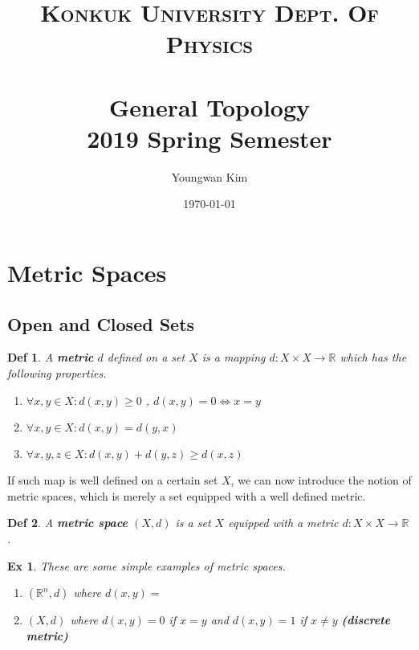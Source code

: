 \documentclass[paper=a4, fontsize=11pt]{scrartcl}
\title{	
	\normalfont \normalsize 
	\textsc{Konkuk University Dept. Of Physics} \\ [25pt] %
	\horrule{1pt} \\[0.4cm] 
	\huge General Topology \\
	\vspace{0.1in}
	\Large 2019 Spring Semester
	\horrule{1pt} \\[0.4cm] 
}
\author{Youngwan Kim}
\date{\normalsize\today}
\newcommand{\subscript}[2]{$#1 _ #2$}
\newtheorem{definition}{Def}
\newtheorem{example}{Ex}
\begin{document}
	
\maketitle	

\section{Metric Spaces} 
\vspace{2.5ex}

\subsection{Open and Closed Sets}

\vspace{2.5ex}

\begin{definition}
	A \textbf{metric} $d$ defined on a set $X$ is a mapping $d:X \times X \to \mathbb{R}$ which has the following properties.
	\begin{enumerate}[label=(\subscript{m}{{\arabic*}})]
		\item $\forall x,y \in X : d(x,y) \geq 0$ , $d(x,y)=0 \iff x=y$
		\item $\forall x,y \in X: d(x,y)=d(y,x)$
		\item $\forall x,y,z \in X : d(x,y)+d(y,z) \geq d(x,z)$\\
	\end{enumerate}
\end{definition}
If such map is well defined on a certain set $X$, we can now introduce the notion of metric spaces, which is merely a set equipped with a well defined metric.
\\
\begin{definition}
	A \textbf{metric space} $(X,d)$ is a set $X$ equipped with a metric $d:X\times X \to \mathbb{R}$.\\
\end{definition}
\begin{example} 
	These are some simple examples of metric spaces.
	\begin{enumerate}[label=\arabic*)]
		\item $(\mathbb{R}^n,d)$ where $d(x,y)=$
		\item $(X,d)$ where $d(x,y)=0$ if $x=y$ and $d(x,y)=1$ if $x\neq y$ \textbf{(discrete metric)}
	\end{enumerate}
\end{example}
\end{document}
